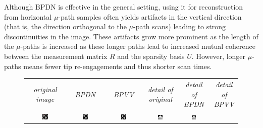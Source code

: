 \documentclass[twocolumn,oneside]{IEEEtran/IEEEtran}
\begin{document}
Although BPDN is effective in the general setting, using it for reconstruction
from horizontal $\mu$-path samples often yields artifacts in the vertical
direction (that is, the direction orthogonal to the $\mu$-path scans) leading to
strong discontinuities in the image. These artifacts grow more prominent as the
length of the $\mu$-paths is increased \cite{maxwell2014compressed} as these
longer paths lead to increased mutual coherence between the measurement matrix
$R$ and the sparsity basis $U$. However, longer $\mu$-paths means fewer
tip re-engagements and thus shorter scan times.
\noindent 
\begingroup \setlength{\tabcolsep}{1pt}
\begin{figure}[h!]
  \centering
  \begin{tabular}{cccccc}
    \textit{\small original image} & \textit{\small BPDN} & \textit{\small BPVV}
    & \textit{\small detail of original} & \textit{\small detail of BPDN} & \textit{\small detail of BPVV} \\
    \includegraphics[width=0.16\textwidth]{figures-SBA/anothergrating_gt_framed}
    & \includegraphics[width=0.16\textwidth]{figures-SBA/anothergrating_40mu}
    & \includegraphics[width=0.16\textwidth]{figures-SBA/anothergrating_bptv_40mu}
    & \includegraphics[width=0.16\textwidth]{figures-SBA/anothergrating_gt_zoomin}
    &\includegraphics[width=0.16\textwidth]{figures-SBA/anothergrating_40mu_zoomin}

\end{tabular}
\end{figure}
\end{document}
